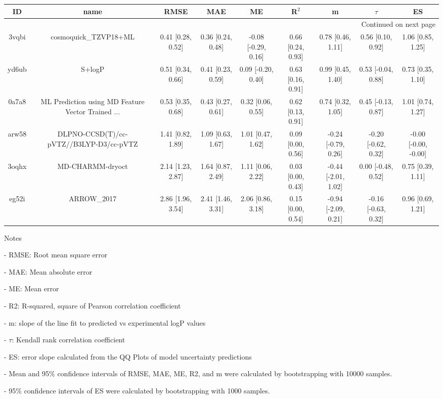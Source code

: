 \documentclass{article}
\begin{document}
\begin{center}
\scriptsize
\begin{longtable}{|ccccccccc|}
\toprule
    ID &                                               name &               RMSE &                MAE &                   ME &              R$^2$ &                    m &               $\tau$ &                    ES \\
\midrule
\endhead
\midrule
\multicolumn{9}{r}{{Continued on next page}} \\
\midrule
\endfoot

\bottomrule
\endlastfoot
 3vqbi &                              cosmoquick\_TZVP18+ML &  0.41 [0.28, 0.52] &  0.36 [0.24, 0.48] &  -0.08 [-0.29, 0.16] &  0.66 [0.24, 0.93] &    0.78 [0.46, 1.11] &    0.56 [0.10, 0.92] &     1.06 [0.85, 1.25] \\
 yd6ub &                                             S+logP &  0.51 [0.34, 0.66] &  0.41 [0.23, 0.59] &   0.09 [-0.20, 0.40] &  0.63 [0.16, 0.91] &    0.99 [0.45, 1.40] &   0.53 [-0.04, 0.88] &     0.73 [0.35, 1.10] \\
 0a7a8 &  ML Prediction using MD Feature Vector Trained ... &  0.53 [0.35, 0.68] &  0.43 [0.27, 0.61] &    0.32 [0.06, 0.55] &  0.62 [0.13, 0.91] &    0.74 [0.32, 1.05] &   0.45 [-0.13, 0.87] &     1.01 [0.74, 1.27] \\
 arw58 &            DLPNO-CCSD(T)/cc-pVTZ//B3LYP-D3/cc-pVTZ &  1.41 [0.82, 1.89] &  1.09 [0.63, 1.67] &    1.01 [0.47, 1.62] &  0.09 [0.00, 0.56] &  -0.24 [-0.79, 0.26] &  -0.20 [-0.62, 0.32] &  -0.00 [-0.00, -0.00] \\
 3oqhx &                                   MD-CHARMM-dryoct &  2.14 [1.23, 2.87] &  1.64 [0.87, 2.49] &    1.11 [0.06, 2.22] &  0.03 [0.00, 0.43] &  -0.44 [-2.01, 1.02] &   0.00 [-0.48, 0.52] &     0.75 [0.39, 1.11] \\
 eg52i &                                        ARROW\_2017 &  2.86 [1.96, 3.54] &  2.41 [1.46, 3.31] &    2.06 [0.86, 3.18] &  0.15 [0.00, 0.54] &  -0.94 [-2.09, 0.21] &  -0.16 [-0.63, 0.32] &     0.96 [0.69, 1.21] \\
\end{longtable}
\end{center}

Notes

- RMSE: Root mean square error

- MAE: Mean absolute error

- ME: Mean error

- R2: R-squared, square of Pearson correlation coefficient

- m: slope of the line fit to predicted vs experimental logP values

- $\tau$:  Kendall rank correlation coefficient

- ES: error slope calculated from the QQ Plots of model uncertainty predictions

- Mean and 95\% confidence intervals of RMSE, MAE, ME, R2, and m were calculated by bootstrapping with 10000 samples.

- 95\% confidence intervals of ES were calculated by bootstrapping with 1000 samples.\end{document}
\end{document}
